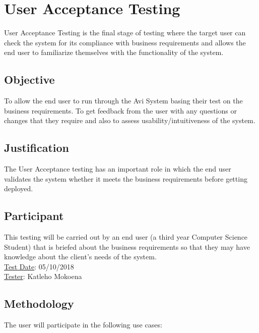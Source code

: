 \documentclass[10pt]{article}
\begin{document}
\section{User Acceptance Testing}

User Acceptance Testing is the final stage of testing where the target user can check the system for its compliance with business requirements and allows the end user to familiarize themselves with the functionality of the system.

\subsection{Objective}
To allow the end user to run through the Avi System basing their test on the business requirements. To get feedback from the user with any questions or changes that they require and also to assess usability/intuitiveness of the system.

\subsection{Justification}
The User Acceptance testing has an important role in which the end user validates the system whether it meets the business requirements before getting deployed. 

\subsection{Participant}
This testing will be carried out by an end user (a third year Computer Science Student) that is briefed about the business requirements so that they may have knowledge about the client’s needs of the system. \\

\underline{Test Date}: 05/10/2018 \\

\underline{Tester}: Katleho Mokoena \\

\subsection{Methodology}

The user will participate in the following use cases: 
\end{document}
